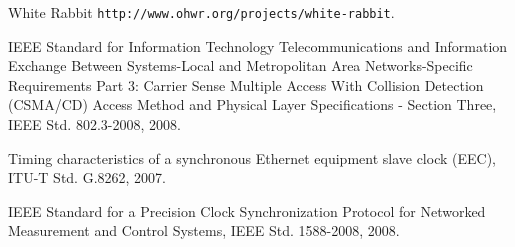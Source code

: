 \begin{thebibliography}{9}   %

White Rabbit \texttt{http://www.ohwr.org/projects/white-rabbit}.

 IEEE Standard for Information Technology Telecommunications and
Information Exchange Between Systems-Local and Metropolitan Area
Networks-Specific Requirements Part 3: Carrier Sense Multiple Access
With Collision Detection (CSMA/CD) Access Method and Physical
Layer Specifications - Section Three, IEEE Std. 802.3-2008, 2008.
 
Timing characteristics of a synchronous Ethernet equipment slave clock 
(EEC), ITU-T Std. G.8262, 2007.
 
IEEE Standard for a Precision Clock Synchronization Protocol for
  Networked Measurement and Control Systems, IEEE Std. 1588-2008,
  2008.



\end{thebibliography}


